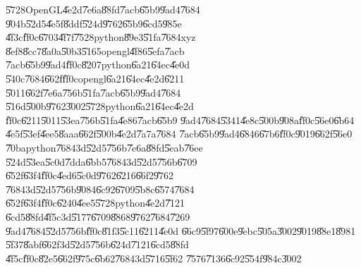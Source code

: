 \bigskip

\U{5728}OpenGL\U{4e2d}\U{7e6a}\U{88fd}\U{7acb}\U{65b9}\U{9ad4}\U{7684}%
\U{904b}\U{52d5}\U{4e5f}\U{8ddf}\U{524d}\U{9762}\U{65b9}\U{6cd5}\U{985e}%
\U{4f3c}\U{ff0c}\U{6703}\U{4f7f}\U{7528}python\U{89e3}\U{51fa}\U{7684}xyz%
\U{8ef8}\U{8cc7}\U{8a0a}\U{50b3}\U{5165}opengl\U{4f86}\U{5efa}\U{7acb}%
\U{7acb}\U{65b9}\U{9ad4}\U{ff0c}\U{8207}python\U{6a21}\U{64ec}\U{4e0d}%
\U{540c}\U{7684}\U{662f}\U{ff0c}opengl\U{6a21}\U{64ec}\U{4e2d}\U{6211}%
\U{5011}\U{662f}\U{7e6a}\U{756b}\U{51fa}\U{7acb}\U{65b9}\U{9ad4}\U{7684}%
\U{516d}\U{500b}\U{9762}\U{3002}\U{5728}python\U{6a21}\U{64ec}\U{4e2d}%
\U{ff0c}\U{6211}\U{5011}\U{53ea}\U{756b}\U{51fa}\U{4e86}\U{7acb}\U{65b9}%
\U{9ad4}\U{7684}\U{5341}\U{4e8c}\U{500b}\U{908a}\U{ff0c}\U{56e0}\U{6b64}%
\U{4e5f}\U{53ef}\U{4ee5}\U{8aaa}\U{662f}\U{500b}\U{4e2d}\U{7a7a}\U{7684}%
\U{7acb}\U{65b9}\U{9ad4}\U{6846}\U{67b6}\U{ff0c}\U{9019}\U{662f}\U{56e0}%
\U{70ba}python\U{7684}3d\U{52d5}\U{756b}\U{7e6a}\U{88fd}\U{5eab}\U{76ee}%
\U{524d}\U{53ea}\U{5c0d}\U{7dda}\U{6bb5}\U{7684}3d\U{52d5}\U{756b}\U{6709}%
\U{652f}\U{63f4}\U{ff0c}\U{4ed6}\U{5c0d}\U{9762}\U{6216}\U{66f2}\U{9762}%
\U{7684}3d\U{52d5}\U{756b}\U{9084}\U{6c92}\U{6709}\U{5b8c}\U{6574}\U{7684}%
\U{652f}\U{63f4}\U{ff0c}\U{6240}\U{4ee5}\U{5728}python\U{4e2d}\U{7121}%
\U{6cd5}\U{88fd}\U{4f5c}3d\U{5177}\U{6709}\U{8868}\U{9762}\U{7684}\U{7269}%
\U{9ad4}\U{7684}\U{52d5}\U{756b}\U{ff0c}\U{81f3}\U{5c11}\U{6211}\U{4e0d}%
\U{66c9}\U{5f97}\U{600e}\U{9ebc}\U{505a}\U{3002}\U{9019}\U{88e1}\U{8981}%
\U{5f37}\U{8abf}\U{662f}3d\U{52d5}\U{756b}\U{624d}\U{7121}\U{6cd5}\U{88fd}%
\U{4f5c}\U{ff0c}\U{82e5}\U{662f}\U{975c}\U{6b62}\U{7684}3d\U{5716}\U{5f62}%
\U{7576}\U{7136}\U{6c92}\U{554f}\U{984c}\U{3002}

\bigskip

